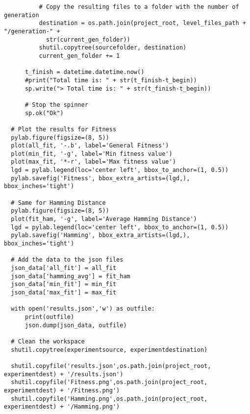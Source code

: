 \begin{verbatim}
          # Copy the resulting files to a folder with the number of generation
          destination = os.path.join(project_root, level_files_path + "/generation-" + 
            str(current_gen_folder))
          shutil.copytree(sourcefolder, destination)
          current_gen_folder += 1

      t_finish = datetime.datetime.now()
      #print("Total time is: " + str(t_finish-t_begin))
      sp.write("> Total time is: " + str(t_finish-t_begin))

      # Stop the spinner
      sp.ok("Ok")
      
  # Plot the results for Fitness
  pylab.figure(figsize=(8, 5))
  plot(all_fit, '-.b', label='General Fitness')
  plot(min_fit, '-g', label='Min fitness value')
  plot(max_fit, '*-r', label='Max fitness value')
  lgd = pylab.legend(loc='center left', bbox_to_anchor=(1, 0.5))
  pylab.savefig('Fitness', bbox_extra_artists=(lgd,), bbox_inches='tight')

  # Same for Hamming Distance
  pylab.figure(figsize=(8, 5))
  plot(fit_ham, '-g', label='Average Hamming Distance')
  lgd = pylab.legend(loc='center left', bbox_to_anchor=(1, 0.5))
  pylab.savefig('Hamming', bbox_extra_artists=(lgd,), bbox_inches='tight')

  # Add the data to the json files
  json_data['all_fit'] = all_fit
  json_data['hamming_avg'] = fit_ham
  json_data['min_fit'] = min_fit
  json_data['max_fit'] = max_fit

  with open('results.json','w') as outfile:
      print(outfile)
      json.dump(json_data, outfile)

  # Clean the workspace
  shutil.copytree(experimentsource, experimentdestination)

  shutil.copyfile('results.json',os.path.join(project_root, experimentdest) + '/results.json')
  shutil.copyfile('Fitness.png',os.path.join(project_root, experimentdest) + '/Fitness.png')
  shutil.copyfile('Hamming.png',os.path.join(project_root, experimentdest) + '/Hamming.png')
\end{verbatim}
